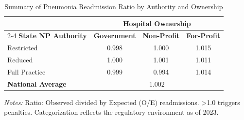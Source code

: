 \begin{table}[htbp]
    \centering
    \caption{Summary of Pneumonia Readmission Ratio by Authority and Ownership}
    \label{tab:rrp_excess_ratio_pn_own}
    \vspace{0.2cm}
    \begin{tabular}{lccc}
        \toprule
        & \multicolumn{3}{c}{\textbf{Hospital Ownership}} \\
        \cmidrule(lr){2-4}
        \textbf{State NP Authority} & \textbf{Government} & \textbf{Non-Profit} & \textbf{For-Profit} \\
        \midrule
        Restricted & 0.998 & 1.000 & 1.015 \\
        Reduced & 1.000 & 1.001 & 1.011 \\
        Full Practice & 0.999 & 0.994 & 1.014 \\
        \midrule
        \textbf{National Average} & \multicolumn{3}{c}{1.002} \\
        \bottomrule
    \end{tabular}
    \vspace{0.1cm}
    \begin{minipage}{0.85\textwidth}
        \footnotesize \textit{Notes:} Ratio: Observed divided by Expected (O/E) readmissions. >1.0 triggers penalties. Categorization reflects the regulatory environment as of 2023.
    \end{minipage}
\end{table}